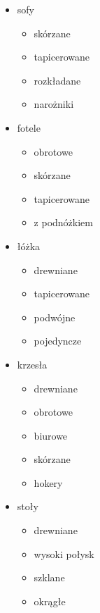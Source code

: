 		\begin{itemize}
			\item{sofy}
                \begin{itemize}
                    \item skórzane
                    \item tapicerowane
                    \item rozkładane
                    \item narożniki
                \end{itemize}
				
				\item{fotele}
					\begin{itemize}
					\item obrotowe
					\item skórzane
					\item tapicerowane
					\item z podnóżkiem
					\end{itemize}
					
            \item{łóżka}
                \begin{itemize}
                    \item drewniane
                    \item tapicerowane
                    \item podwójne
                    \item pojedyncze
                \end{itemize}
					
            \item{krzesła}
                \begin{itemize}
                    \item drewniane
                    \item obrotowe
                    \item biurowe
                    \item skórzane
                    \item hokery
                \end{itemize}
					
				\item{stoły}
                \begin{itemize}
                    \item drewniane
                    \item wysoki połysk
                    \item szklane
                    \item okrągłe
                \end{itemize}
					

\end{itemize}
